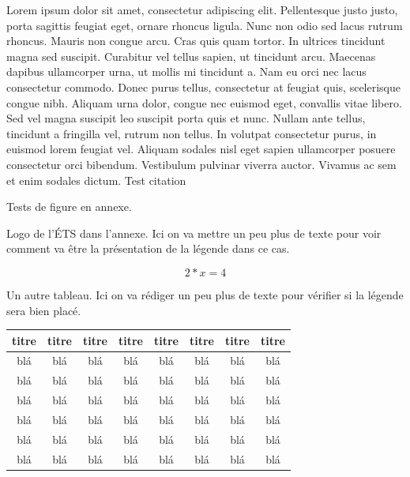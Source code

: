 \documentclass[letterpaper, twoside, 12pt, memoire, creativecommons, hyperref]{thETS}
\begin{document}
Lorem ipsum dolor sit amet, consectetur adipiscing elit. Pellentesque justo justo, porta sagittis feugiat eget, ornare rhoncus ligula. Nunc non odio sed lacus rutrum rhoncus. Mauris non congue arcu. Cras quis quam tortor. In ultrices tincidunt magna sed suscipit. Curabitur vel tellus sapien, ut tincidunt arcu. Maecenas dapibus ullamcorper urna, ut mollis mi tincidunt a. Nam eu orci nec lacus consectetur commodo. Donec purus tellus, consectetur at feugiat quis, scelerisque congue nibh. Aliquam urna dolor, congue nec euismod eget, convallis vitae libero. Sed vel magna suscipit leo suscipit porta quis et nunc. Nullam ante tellus, tincidunt a fringilla vel, rutrum non tellus. In volutpat consectetur purus, in euismod lorem feugiat vel. Aliquam sodales nisl eget sapien ullamcorper posuere consectetur orci bibendum. Vestibulum pulvinar viverra auctor. Vivamus ac sem et enim sodales dictum. Test citation \cite{Bha10}

Tests de figure en annexe.

%

\begin{figureap}[ht]
	\caption{Logo de l'ÉTS dans l'annexe. Ici on va mettre un peu plus de texte pour voir comment va être la présentation de
	la légende dans ce cas.}
	\label{fig:testap}
\end{figureap}
\begin{center}
\begin{equation} 
2*x=4 
\end{equation}
\end{center}

\begin{tableap}[*ht]
	\caption{Un autre tableau. Ici on va rédiger un peu plus de texte pour vérifier si la légende sera bien placé.}
		\begin{tabular}{|c|c|c|c|c|c|c|c|}
		\hline
			{\bf titre} & {\bf titre} & {\bf titre} & {\bf titre} & {\bf titre} & {\bf titre} & {\bf titre} & {\bf titre} \\
	  \hline
			blá & blá & blá & blá & blá & blá & blá & blá \\
	  \hline
			blá & blá & blá & blá & blá & blá & blá & blá \\
	  \hline
			blá & blá & blá & blá & blá & blá & blá & blá \\
	  \hline
			blá & blá & blá & blá & blá & blá & blá & blá \\
	  \hline
			blá & blá & blá & blá & blá & blá & blá & blá \\
	  \hline
			blá & blá & blá & blá & blá & blá & blá & blá \\
	  \hline
		\end{tabular}
	\label{tab:tableau_annexe}
\end{tableap}
\end{document}
